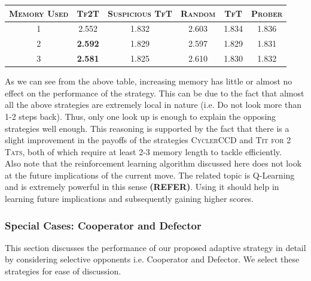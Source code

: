 \documentclass[a4paper]{article}
\begin{document}
	\begin{table}[H]
	  \begin{center}
	    \begin{tabular}{|c|c|c|c|c|c|}
	      \toprule
	 	  \textsc{Memory Used} & \textsc{Tf2T} & {\footnotesize{\textsc{Suspicious TfT}}} & \textsc{Random} & \textsc{TfT} & \textsc{Prober}\\
	      \midrule
		  1	& 2.552 & 1.832 & 2.603 & 1.834 & 1.836\\
		  2 & \textbf{2.592} & 1.829 & 2.597 & 1.829 & 1.831\\
		  3 & \textbf{2.581} & 1.825 & 2.610 & 1.830 & 1.832\\
		\bottomrule
	    \end{tabular}
	  \end{center}
	\end{table}  		
	 
	\vspace{-5mm}	

	As we can see from the above table, increasing memory has little or almost no effect on the performance of the strategy. This can be due to the fact that almost all the above strategies are extremely local in nature (i.e. Do not look more than 1-2 steps back). Thus, only one look up is enough to explain the opposing strategies well enough. This reasoning is supported by the fact that there is a slight improvement in the payoffs of the strategies  \textsc{CyclerCCD} and \textsc{Tit for 2 Tats}, both of which require at least 2-3 memory length to tackle efficiently.\\
	
	Also note that the reinforcement learning algorithm discussed here does not look at the future implications of the current move. The related topic is Q-Learning and is extremely powerful in this sense \textbf{(REFER)}. Using it should help in learning future implications and subsequently gaining higher scores.
	 
	\subsubsection{Special Cases: Cooperator and Defector}

	This section discusses the performance of our proposed adaptive strategy in detail by considering selective opponents i.e. Cooperator and Defector. We select these strategies for ease of discussion.\\
	
\end{document}
